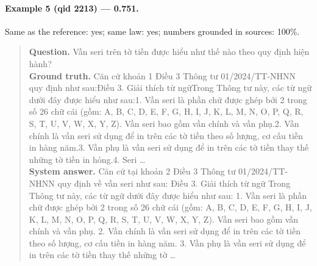 \paragraph{Example 5 (qid 2213) --- \rl{} 0.751.} Same \dieu{} as the reference: yes; same law: yes; numbers grounded in sources: 100\%.
\begin{quote}\small\textbf{Question.} Vần seri trên tờ tiền được hiểu như thế nào theo quy định hiện hành?\\[2pt]
\textbf{Ground truth.} Căn cứ khoản 1 Điều 3 Thông tư 01/2024/TT-NHNN quy định như sau:Điều 3. Giải thích từ ngữTrong Thông tư này, các từ ngữ dưới đây được hiểu như sau:1. Vần seri là phần chữ được ghép bởi 2 trong số 26 chữ cái (gồm: A, B, C, D, E, F, G, H, I, J, K, L, M, N, O, P, Q, R, S, T, U, V, W, X, Y, Z). Vần seri bao gồm vần chính và vần phụ.2. Vần chính là vần seri sử dụng để in trên các tờ tiền theo số lượng, cơ cấu tiền in hàng năm.3. Vần phụ là vần seri sử dụng để in trên các tờ tiền thay thế những tờ tiền in hỏng.4. Seri …\\[2pt]
\textbf{System answer.} Căn cứ tại khoản 2 Điều 3 Thông tư 01/2024/TT-NHNN quy định về vần seri như sau: Điều 3. Giải thích từ ngữ Trong Thông tư này, các từ ngữ dưới đây được hiểu như sau: 1. Vần seri là phần chữ được ghép bởi 2 trong số 26 chữ cái (gồm: A, B, C, D, E, F, G, H, I, J, K, L, M, N, O, P, Q, R, S, T, U, V, W, X, Y, Z). Vần seri bao gồm vần chính và vần phụ. 2. Vần chính là vần seri sử dụng để in trên các tờ tiền theo số lượng, cơ cấu tiền in hàng năm. 3. Vần phụ là vần seri sử dụng để in trên các tờ tiền thay thế những tờ …\end{quote}

